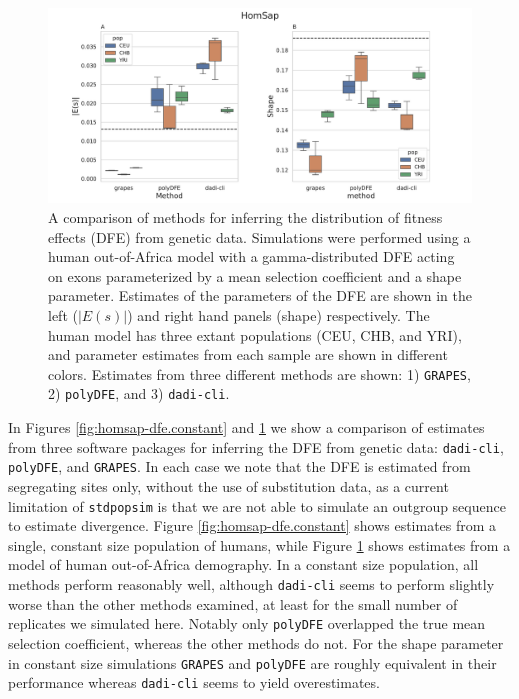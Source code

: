 \documentclass[hidelinks]{article}
\newcommand{\stdpopsim}{\texttt{stdpopsim}\xspace}
\newcommand{\polydfe}{\texttt{polyDFE}\xspace}
\newcommand{\dadicli}{\texttt{dadi-cli}\xspace}
\newcommand{\grapes}{\texttt{GRAPES}\xspace}
\begin{document}
    \begin{figure}[htbp]
        \centering
        \includegraphics[width=\linewidth]{figures/HomSap/OOA/HomSap_OutOfAfricaArchaicAdmixture_5R19_Gamma_K17_ensembl_havana_104_exons_DFE_plot}
        \caption{A comparison of methods for inferring the distribution of fitness effects (DFE) from genetic data.
        Simulations were performed using a human out-of-Africa model \citep{ragsdale2019models} with a gamma-distributed DFE
        acting on exons parameterized by a mean selection coefficient and a shape parameter. Estimates of the 
        parameters of the DFE are shown in the left ($\lvert E(s) \rvert $) and right hand panels (shape) respectively.
        The human model has three extant populations (CEU, CHB, and YRI), and parameter estimates from each
        sample are shown in different colors.
        Estimates from three different methods are shown: 1) \grapes \cite{galtier2016adaptive}, 2) \polydfe \citep{tataru2020polydfe},
        and 3) \dadicli \citep{Huang2023}.
}
        \label{fig:homsap-dfe.ooa}
    \end{figure}

    In Figures \ref{fig:homsap-dfe.constant} and \ref{fig:homsap-dfe.ooa} we show a comparison of estimates
    from three software packages for inferring the DFE from genetic data:
    \dadicli \citep{Huang2023}, \polydfe \citep{tataru2020polydfe}, 
    and \grapes \citep{galtier2016adaptive}.
    In each case we note that the DFE is estimated from segregating sites only,
    without the use of substitution data, as a current limitation of \stdpopsim
    is that we are not able to simulate an outgroup sequence to estimate
    divergence. 
    Figure \ref{fig:homsap-dfe.constant} shows estimates from a single, constant size population of humans, 
    while Figure \ref{fig:homsap-dfe.ooa} shows estimates from a model of human out-of-Africa demography.
    In a constant size population, all methods perform reasonably well, although \dadicli seems to
    perform slightly worse than the other methods examined, at least for the small number of replicates we simulated here.
    Notably only \polydfe overlapped the true mean selection coefficient, whereas 
    the other methods do not. 
    For the shape parameter in constant size simulations \grapes and \polydfe are roughly
    equivalent in their performance whereas \dadicli seems to yield overestimates. 
    
\end{document}
